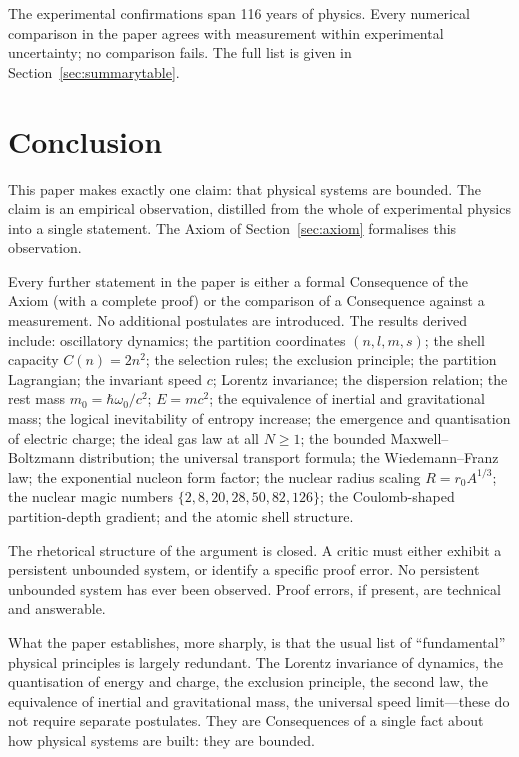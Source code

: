 \documentclass[11pt,twocolumn,a4paper]{article}
\theoremstyle{axiomstyle}
\theoremstyle{conseqstyle}
\theoremstyle{definition}
\theoremstyle{remark}
\begin{document}
The experimental confirmations span 116 years of physics. Every numerical comparison in the paper agrees with measurement within experimental uncertainty; no comparison fails. The full list is given in Section~\ref{sec:summarytable}.

\section{Conclusion}
\label{sec:conclusion}

This paper makes exactly one claim: that physical systems are bounded. The claim is an empirical observation, distilled from the whole of experimental physics into a single statement. The Axiom of Section~\ref{sec:axiom} formalises this observation.

Every further statement in the paper is either a formal Consequence of the Axiom (with a complete proof) or the comparison of a Consequence against a measurement. No additional postulates are introduced. The results derived include: oscillatory dynamics; the partition coordinates $(n,l,m,s)$; the shell capacity $C(n)=2n^{2}$; the selection rules; the exclusion principle; the partition Lagrangian; the invariant speed $c$; Lorentz invariance; the dispersion relation; the rest mass $m_{0}=\hbar\omega_{0}/c^{2}$; $E=mc^{2}$; the equivalence of inertial and gravitational mass; the logical inevitability of entropy increase; the emergence and quantisation of electric charge; the ideal gas law at all $N\ge 1$; the bounded Maxwell--Boltzmann distribution; the universal transport formula; the Wiedemann--Franz law; the exponential nucleon form factor; the nuclear radius scaling $R=r_{0}A^{1/3}$; the nuclear magic numbers $\{2,8,20,28,50,82,126\}$; the Coulomb-shaped partition-depth gradient; and the atomic shell structure.

The rhetorical structure of the argument is closed. A critic must either exhibit a persistent unbounded system, or identify a specific proof error. No persistent unbounded system has ever been observed. Proof errors, if present, are technical and answerable.

What the paper establishes, more sharply, is that the usual list of ``fundamental'' physical principles is largely redundant. The Lorentz invariance of dynamics, the quantisation of energy and charge, the exclusion principle, the second law, the equivalence of inertial and gravitational mass, the universal speed limit---these do not require separate postulates. They are Consequences of a single fact about how physical systems are built: they are bounded.
\end{document}
